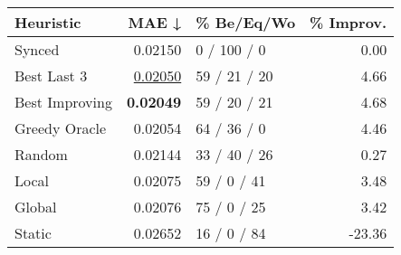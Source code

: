 \begin{tabular}{lrlr}
\toprule
\textbf{Heuristic} & \textbf{MAE ↓} & \textbf{\% Be/Eq/Wo} & \textbf{\% Improv.} \\
\midrule
            Synced &        0.02150 &          0 / 100 / 0 &                0.00 \\
\midrule
       Best Last 3 &        \underline{0.02050} &         59 / 21 / 20 &                4.66 \\
    Best Improving &        \textbf{0.02049} &         59 / 20 / 21 &                4.68 \\
\addlinespace
     Greedy Oracle &        0.02054 &          64 / 36 / 0 &                4.46 \\
            Random &        0.02144 &         33 / 40 / 26 &                0.27 \\
\midrule
             Local &        0.02075 &          59 / 0 / 41 &                3.48 \\
            Global &        0.02076 &          75 / 0 / 25 &                3.42 \\
\midrule
            Static &        0.02652 &          16 / 0 / 84 &              -23.36 \\
\bottomrule
\end{tabular}

\label{tab:iid_lr01_le2_bs4_Summary}
